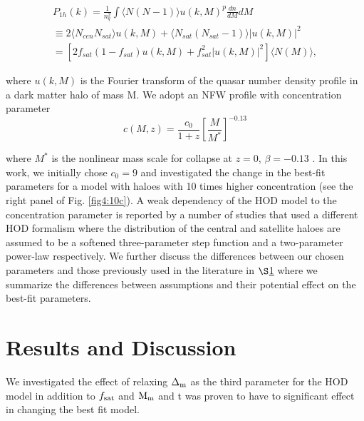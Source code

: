 \documentclass[useAMS,usenatbib]{mn2e}
\begin{document}
 \begin{multline}
P_{1h}(k) = \frac{1}{n^{2}_{q}} \int \langle N(N-1)\rangle u(k,M)^p \frac{dn}{dM} dM  \\
\equiv 2 \langle N_{cen} N_{sat}\rangle u(k,M) + \langle N_{sat}(N_{sat}-1)\rangle |u(k,M)|^2 \\
%  
= [2 f_{sat}(1-f_{sat}) u(k,M)+f_{sat}^2 |u(k,M)|^2] \langle N(M)\rangle,
 \end{multline}

where $u(k,M)$ is the Fourier transform of the quasar number density profile in 
a dark matter halo of mass M. We adopt an NFW profile \citep{nfw97} with 
concentration parameter
\begin{equation}
c(M,z) = \frac{c_{0}}{1+z}[\frac{M}{M^{*}}]^{-0.13}
\end{equation}

 where $M^{*}$ is the nonlinear mass scale for collapse at $z=0$, $\beta = 
-0.13$ \citep{cs02}. In this work, we initially chose $c_0=9$ and investigated 
the change in the best-fit parameters for a model with haloes with 10 times 
higher concentration (see the right panel of Fig. \ref{fig4:10c}). A weak 
dependency of the HOD model to the concentration parameter is reported by a 
number of studies \citep{ric12,ric13,sh13} that used a different HOD formalism 
where the distribution of the central and satellite haloes are assumed to be a 
softened three-parameter step function and a two-parameter power-law 
respectively.
 We further discuss the differences between our chosen parameters and those 
previously used in the literature in $\S$\ref{res} where we summarize the 
differences between assumptions and their potential effect on the best-fit 
parameters.    

\section{Results and Discussion}\label{res}


 We investigated the effect of relaxing $\Delta_{\rm m}$ as the third parameter for the HOD model in addition to $f_{\rm sat}$ and $\rm M_{m}$ and t was proven to have to significant effect in changing the best fit model.



\end{document}

